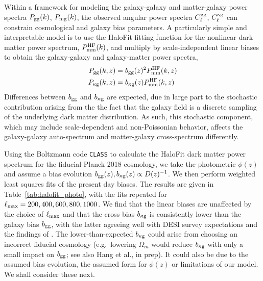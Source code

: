 Within a framework for modeling the galaxy-galaxy and matter-galaxy power spectra $P_{\rm gg}(k)$, $P_{\rm mg}(k)$, the observed angular power spectra $C_{\ell}^{\rm gg}$, $C_{\ell}^{\rm \kappa g}$ can constrain cosmological and galaxy bias parameters. A particularly simple and interpretable model is to use the HaloFit \citep{Smith++03} fitting function for the nonlinear dark matter power spectrum, $P_{\rm mm}^{\rm HF}(k)$, and multiply by scale-independent linear biases to obtain the galaxy-galaxy and galaxy-matter power spectra,
\begin{align}
    P_{\rm gg}(k,z) &= b_{\rm gg}(z)^2 P_{\rm mm}^{\rm HF}(k,z) \\
    P_{\rm \kappa g}(k,z) &= b_{\rm \kappa g}(z) P_{\rm mm}^{\rm HF}(k,z)
\end{align}
Differences between $b_{\rm gg}$ and $b_{\rm \kappa g}$ are expected, due in large part to the stochastic contribution arising from the the fact that the galaxy field is a discrete sampling of the underlying dark matter distribution. As such, this stochastic component, which may include scale-dependent and non-Poissonian behavior, affects the galaxy-galaxy auto-spectrum and matter-galaxy cross-spectrum differently.

Using the Boltzmann code \texttt{CLASS} \citep{Blas++11} to calculate the HaloFit dark matter power spectrum for the fiducial Planck 2018 cosmology, we take the photometric $\phi(z)$ and assume a bias evolution $b_{\rm gg}(z), b_{\rm \kappa g}(z) \propto D(z)^{-1}$. We then perform weighted least squares fits of the present day biases. The results are given in Table~\ref{tab:halofit_photo}, with the fits repeated for $\ell_{\rm max} = 200, 400, 600, 800, 1000$. We find that the linear biases are unaffected by the choice of $\ell_{\rm max}$ and that the cross bias $b_{\rm \kappa g}$ is consistently lower than the galaxy bias $b_{\rm gg}$, with the latter agreeing well with DESI survey expectations and the findings of \citealt{Kitanidis++19}.  The lower-than-expected $b_{\rm \kappa g}$ could arise from choosing an incorrect fiducial cosmology (e.g.\ lowering $\Omega_m$ would reduce $b_{\rm \kappa g}$ with only a small impact on $b_{\rm gg}$; see also Hang et al., in prep).  It could also be due to the assumed bias evolution, the assumed form for $\phi(z)$ or limitations of our model.  We shall consider these next.

